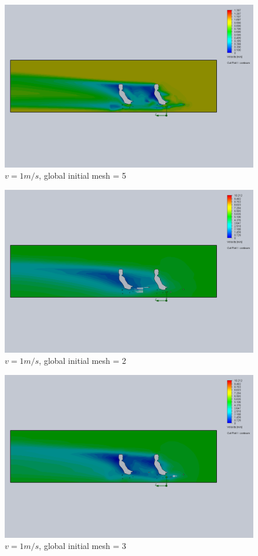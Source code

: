 \documentclass[11pt]{article}
\begin{document}
\begin{figure}
\includegraphics[width=\textwidth]{gm_5_rf_7_v01.png}
\caption{$v = 1 m/s$, global initial mesh = 5}
\end{figure}


\begin{figure}
\includegraphics[width=\textwidth]{gm_2_rf_7_v05.png}
\caption{$v = 1 m/s$, global initial mesh = 2}
\end{figure}

\begin{figure}
\includegraphics[width=\textwidth]{gm_3_rf_7_v05.png}
\caption{$v = 1 m/s$, global initial mesh = 3}
\end{figure}
\end{document}
